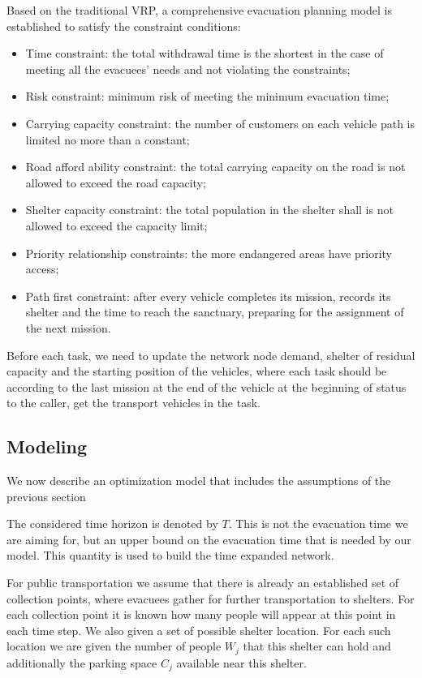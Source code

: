 \documentclass{mcmthesis}
\begin{document}
Based on the traditional VRP, a comprehensive evacuation planning model is established to satisfy the constraint conditions:
\begin{itemize}
  \item Time constraint: the total withdrawal time is the shortest in the case of meeting all the evacuees' needs and not violating the constraints;
  \item Risk constraint: minimum risk of meeting the minimum evacuation time;
  \item Carrying capacity constraint: the number of customers on each vehicle path is limited no more than a constant;
  \item Road afford ability constraint: the total carrying capacity on the road is not allowed to exceed the road capacity;
  \item Shelter capacity constraint: the total population in the shelter shall is not allowed to exceed the capacity limit;
  \item Priority relationship constraints: the more endangered areas have priority access;
  \item Path first constraint: after every vehicle completes its mission, records its shelter and the time to reach the sanctuary, preparing for the assignment of the next mission.
\end{itemize}

Before each task, we need to update the network node demand, shelter of residual capacity and the starting position of the vehicles, where each task should be according to the last mission at the end of the vehicle at the beginning of status to the caller, get the transport vehicles in the task.

\subsection{Modeling}

We now describe an optimization model that includes the assumptions of the previous section %

The considered time horizon is denoted by $T$. This is not the evacuation time we are aiming for, but an upper bound on the evacuation time that is needed by our model. This quantity is used to build the time expanded network.

For public transportation we assume that there is already an established set of collection points, where evacuees gather for further transportation to shelters. For each collection point it is known how many people will appear at this point in each time step. We also given a set of possible shelter location. For each such location we are given the number of people ${W_j}$ that this shelter can hold and additionally the parking space ${C_j}$ available near this shelter.
\end{document}
